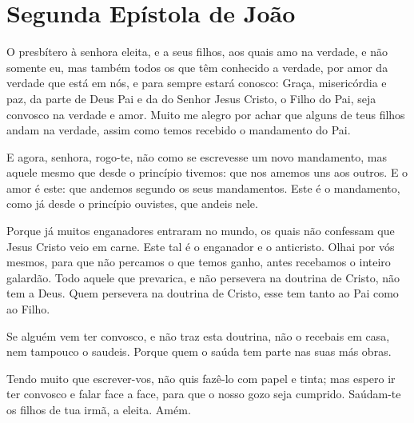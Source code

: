 \thispagestyle{empty}
\chapter*{Segunda Epístola de João}

O presbítero à senhora eleita, e a seus filhos, aos quais amo na
verdade, e não somente eu, mas também todos os que têm conhecido a
verdade, por amor da verdade que está em nós, e para sempre
estará conosco: Graça, misericórdia e paz, da parte de Deus Pai
e da do Senhor Jesus Cristo, o Filho do Pai, seja convosco na
verdade e amor. Muito me alegro por achar que alguns de teus
filhos andam na verdade, assim como temos recebido o mandamento do
Pai.

E agora, senhora, rogo-te, não como se escrevesse um novo
mandamento, mas aquele mesmo que desde o princípio tivemos: que nos
amemos uns aos outros. E o amor é este: que andemos segundo os
seus mandamentos. Este é o mandamento, como já desde o princípio
ouvistes, que andeis nele.

Porque já muitos enganadores entraram no mundo, os quais não
confessam que Jesus Cristo veio em carne. Este tal é o enganador e o
anticristo. Olhai por vós mesmos, para que não percamos o que
temos ganho, antes recebamos o inteiro galardão. Todo aquele que
prevarica, e não persevera na doutrina de Cristo, não tem a Deus.
Quem persevera na doutrina de Cristo, esse tem tanto ao Pai como ao
Filho.

Se alguém vem ter convosco, e não traz esta doutrina, não o
recebais em casa, nem tampouco o saudeis. Porque quem o saúda
tem parte nas suas más obras.

Tendo muito que escrever-vos, não quis fazê-lo com papel e tinta;
mas espero ir ter convosco e falar face a face, para que o nosso
gozo seja cumprido. Saúdam-te os filhos de tua irmã, a
eleita. Amém.
